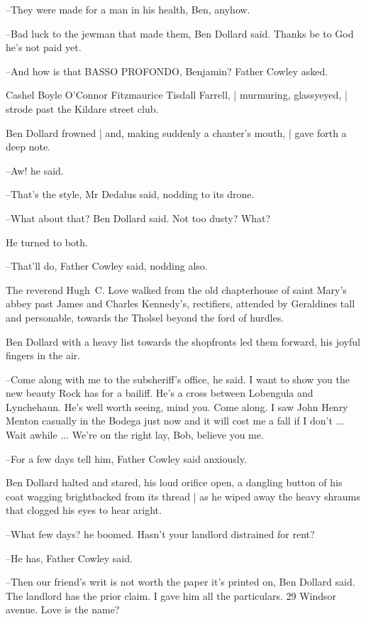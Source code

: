 --They were made for a man in his health, Ben, anyhow.

--Bad luck to the jewman that made them,
Ben Dollard said.
Thanks be to
God he's not paid yet.

--And how is that BASSO PROFONDO, Benjamin?
Father Cowley asked.

Cashel Boyle O'Connor Fitzmaurice Tisdall Farrell, |
murmuring, glassyeyed, |
strode past the Kildare street club.

Ben Dollard frowned |
and, making suddenly a chanter's mouth, |
gave forth a deep note.

--Aw!
he said.

--That's the style,
Mr Dedalus said,
nodding to its drone.

--What about that?
Ben Dollard said.
Not too dusty?
What?

He turned to both.

--That'll do,
Father Cowley said,
nodding also.

The reverend Hugh~C. Love
walked from the old chapterhouse of saint Mary's abbey
past James and Charles Kennedy's, rectifiers,
attended by Geraldines tall and personable,
towards the Tholsel beyond the ford of hurdles.

Ben Dollard
with a heavy list towards the shopfronts
led them forward,
his joyful fingers in the air.

--Come along with me to the subsheriff's office,
he said.
I want to show
you the new beauty Rock has for a bailiff.
He's a cross between Lobengula
and Lynchehaun.
He's well worth seeing, mind you.
Come along.
I saw John
Henry Menton casually in the Bodega just now
and it will cost me a fall
if I don't ...
Wait awhile ...
We're on the right lay, Bob, believe you
me.

--For a few days tell him,
Father Cowley said anxiously.

Ben Dollard halted and stared,
his loud orifice open,
a dangling button of his coat wagging brightbacked from its thread |
as he wiped away the heavy shraums that clogged his eyes
to hear aright.

--What few days?
he boomed.
Hasn't your landlord distrained for rent?

--He has,
Father Cowley said.

--Then our friend's writ is not worth the paper it's printed on,
Ben
Dollard said.
The landlord has the prior claim.
I gave him all the
particulars.
29 Windsor avenue.
Love is the name?


